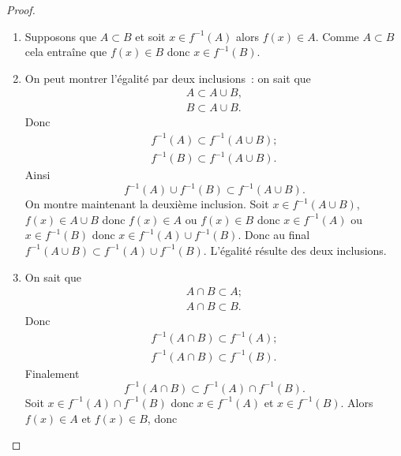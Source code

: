 \begin{proof}
    \begin{enumerate}
        \item Supposons que \(A \subset B\) et soit \(x \in f^{-1}(A)\) alors 
            \(f(x) \in A\). Comme \(A\subset B\) cela entraîne que \(f(x) \in 
            B\) donc \(x \in f^{-1}(B)\).
        \item On peut montrer l'égalité par deux inclusions~: on sait que
            \begin{gather*}
                A \subset A \cup B, \\
                B \subset A \cup B.
            \end{gather*}
            Donc
            \begin{gather*} 
                f^{-1}(A) \subset f^{-1}(A \cup B); \\
                f^{-1}(B) \subset f^{-1}(A \cup B).
            \end{gather*}
            Ainsi 
            \begin{equation*}
                f^{-1}(A) \cup f^{-1}(B) \subset f^{-1}(A \cup B).
            \end{equation*}
            On montre maintenant la deuxième inclusion. Soit \(x \in f^{-1}(A 
            \cup B)\), \(f(x) \in A \cup B\) donc \(f(x) \in A\) ou \(f(x) \in 
            B\) donc \(x \in f^{-1}(A)\) ou \(x \in f^{-1}(B)\) donc \(x \in 
            f^{-1}(A) \cup f^{-1}(B)\). Donc au final \(f^{-1}(A \cup B) \subset 
            f^{-1}(A) \cup f^{-1}(B)\). L'égalité résulte des deux inclusions.
        \item On sait que
            \begin{gather*}
                A \cap B \subset A ; \\ A \cap B \subset B.
            \end{gather*}
            Donc
            \begin{gather*}
                f^{-1}(A \cap B) \subset f^{-1}(A); \\ f^{-1}(A \cap B) \subset 
                f^{-1}(B).
            \end{gather*}
            Finalement
            \begin{equation*}
                f^{-1}(A \cap B) \subset f^{-1}(A) \cap f^{-1}(B).
            \end{equation*}
            Soit \(x \in f^{-1}(A) \cap f^{-1}(B)\) donc \(x \in f^{-1}(A)\) et 
            \(x \in f^{-1}(B)\). Alors \(f(x) \in A\) et \(f(x) \in B\), donc 

\end{enumerate}
\end{proof}
